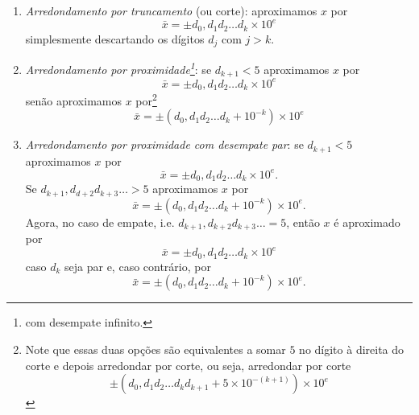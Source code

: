 \begin{enumerate}
\item \emph{Arredondamento por truncamento} (ou corte): aproximamos $x$ por
\begin{equation}
  \bar{x} = \pm d_{0},d_{1}d_{2}\ldots d_{k}\times 10^e
\end{equation}
simplesmente descartando os dígitos $d_{j}$ com $j > k$.
\item \emph{Arredondamento por proximidade\footnote{com desempate infinito.}}: se $d_{k+1}<5$ aproximamos $x$ por
\begin{equation}
  \bar{x} = \pm d_0,d_1d_2\ldots d_{k}\times 10^{e}
\end{equation}
senão aproximamos $x$ por\footnote{Note que essas duas opções são equivalentes a somar $5$ no dígito à direita do corte e depois arredondar por corte, ou seja, arredondar por corte
\begin{equation}  \pm(d_0,d_1d_2\ldots d_kd_{k+1}+ 5 \times10^{-(k+1)} )\times 10^{e}  \end{equation}}
\begin{equation}
 \bar{x} = \pm (d_0,d_1d_2\ldots d_{k} + 10^{-k}) \times 10^{e}
\end{equation}
\item \emph{Arredondamento por proximidade com desempate par}: se $d_{k+1}<5$ aproximamos $x$ por
\begin{equation}
  \bar{x} = \pm d_0,d_1d_2\ldots d_{k}\times 10^{e}.
\end{equation}
Se $d_{k+1},d_{d+2}d_{k+3}\ldots>5$ aproximamos $x$ por
\begin{equation}
 \bar{x} = \pm (d_0,d_1d_2\ldots d_{k} + 10^{-k}) \times 10^{e}.
\end{equation}
Agora, no caso de empate, i.e. $d_{k+1},d_{k+2}d_{k+3}\ldots = 5$, então $x$ é aproximado por
\begin{equation}
  \bar{x} = \pm d_0,d_1d_2\ldots d_{k}\times 10^{e}
\end{equation}
caso $d_{k}$ seja par e, caso contrário, por
\begin{equation}
 \bar{x} = \pm (d_0,d_1d_2\ldots d_{k} + 10^{-k}) \times 10^{e}.
\end{equation}
\end{enumerate}

